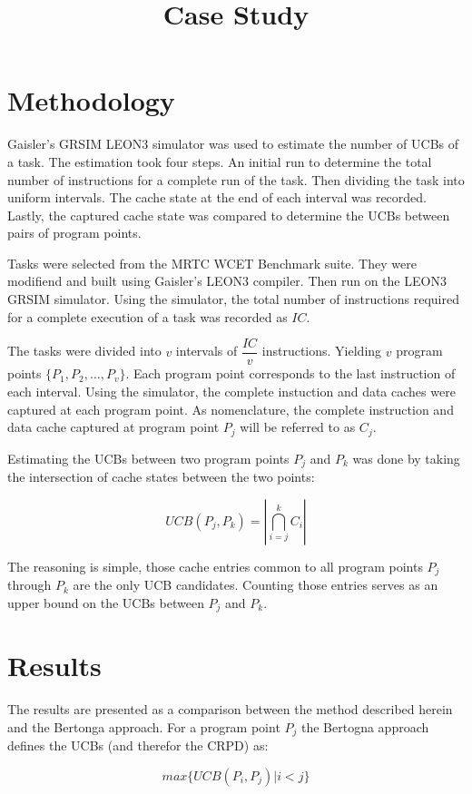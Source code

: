 \documentclass[12pt]{article}
\title{Case Study}
\begin{document}
\section{Methodology}

Gaisler's GRSIM LEON3 simulator was used to estimate the number of
UCBs of a task. The estimation took four steps. An initial run to
determine the total number of instructions for a complete run of the
task. Then dividing the task into uniform intervals. The cache state
at the end of each interval was recorded. Lastly, the captured cache
state was compared to determine the UCBs between pairs of program points.

Tasks were selected from the MRTC WCET Benchmark suite. They were
modifiend and built using Gaisler's LEON3 compiler. Then run on the
LEON3 GRSIM simulator. Using the simulator, the total number of
instructions required for a complete execution of a task was recorded
as ${IC}$.

The tasks were divided into ${v}$ intervals of ${\dfrac{IC}{v}}$
instructions. Yielding ${v}$ program points ${\{P_1, P_2, \ldots,
  P_v\}}$. Each program point corresponds to the last instruction of
each interval. Using the simulator, the complete instuction and data
caches were captured at each program point. As nomenclature, the complete
instruction and data cache captured at program point ${P_j}$ will be
referred to as ${C_j}$.


Estimating the UCBs between two program points ${P_j}$ and ${P_k}$ was
done by taking the intersection of cache states between the two
points: 

\begin{equation*}
  UCB(P_j, P_k) = \left\vert\bigcap_{i=j}^{k}C_i\right\vert
\end{equation*}

The reasoning
is simple, those cache entries common to all program points ${P_j}$
through ${P_k}$ are the only UCB candidates. Counting those entries
serves as an upper bound on the UCBs between ${P_j}$ and ${P_k}$.

\section{Results}

The results are presented as a comparison between the method described
herein and the Bertonga approach. For a program point ${P_j}$ the
Bertogna approach defines the UCBs (and therefor the CRPD) as:

\begin{equation*}
  max\{ UCB(P_i, P_j) \vert i < j \}
\end{equation*}
\end{document}
